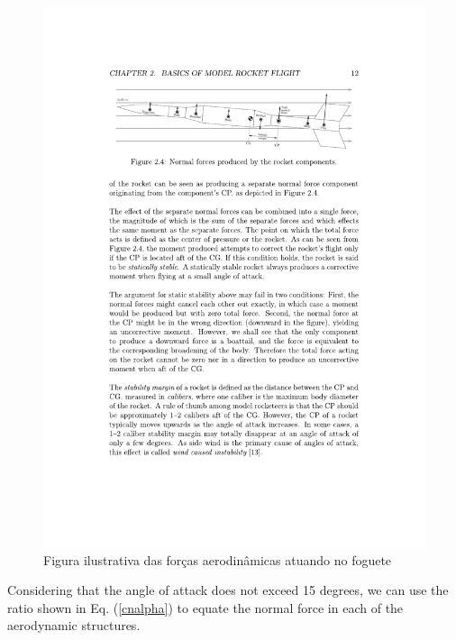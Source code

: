 \documentclass[10pt,fleqn,a4paper,twoside]{article}
\begin{document}
\begin{figure}[h!]
	\centering
	\includegraphics[angle=0, trim={3cm 21.5cm 3cm 4cm}, clip, scale=0.7]{imagens/aeroforces}
	\caption{Figura ilustrativa das forças aerodinâmicas atuando no foguete}
	\label{aeroforces}
\end{figure}


Considering that the angle of attack does not exceed 15 degrees, we can use the ratio shown in Eq. (\ref {cnalpha}) to equate the normal force in each of the aerodynamic structures.
\end{document}
